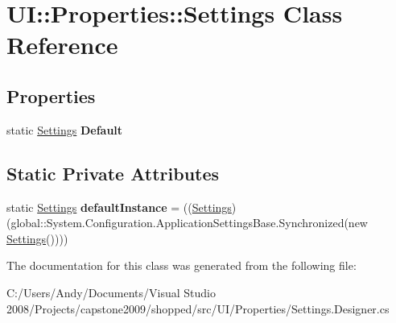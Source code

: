 \hypertarget{class_u_i_1_1_properties_1_1_settings}{
\section{UI::Properties::Settings Class Reference}
\label{class_u_i_1_1_properties_1_1_settings}
}
\subsection*{Properties}
\begin{DoxyCompactItemize}
\item 
\hypertarget{class_u_i_1_1_properties_1_1_settings_a15a0e6993e5dd68352a2c6f989ad5943}{
static \hyperlink{class_u_i_1_1_properties_1_1_settings}{Settings} {\bfseries Default}}
\label{class_u_i_1_1_properties_1_1_settings_a15a0e6993e5dd68352a2c6f989ad5943}

\end{DoxyCompactItemize}
\subsection*{Static Private Attributes}
\begin{DoxyCompactItemize}
\item 
\hypertarget{class_u_i_1_1_properties_1_1_settings_a654aafd84668bf6efdca665b4534ec55}{
static \hyperlink{class_u_i_1_1_properties_1_1_settings}{Settings} {\bfseries defaultInstance} = ((\hyperlink{class_u_i_1_1_properties_1_1_settings}{Settings})(global::System.Configuration.ApplicationSettingsBase.Synchronized(new \hyperlink{class_u_i_1_1_properties_1_1_settings}{Settings}())))}
\label{class_u_i_1_1_properties_1_1_settings_a654aafd84668bf6efdca665b4534ec55}

\end{DoxyCompactItemize}


The documentation for this class was generated from the following file:\begin{DoxyCompactItemize}
\item 
C:/Users/Andy/Documents/Visual Studio 2008/Projects/capstone2009/shopped/src/UI/Properties/Settings.Designer.cs\end{DoxyCompactItemize}

